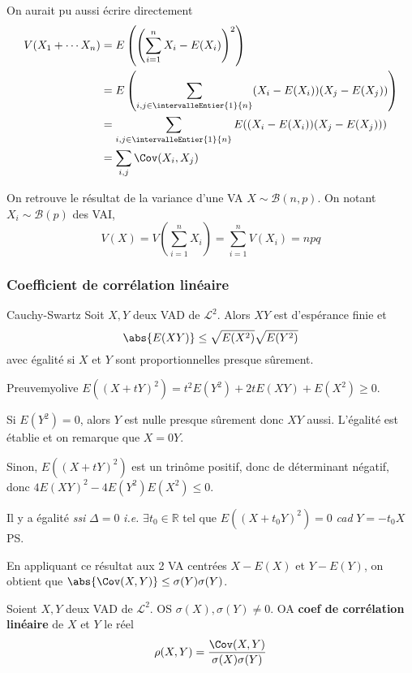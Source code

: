     On aurait pu aussi écrire directement
    \begin{align*}
        V(X_1 + \cdots X_n) 
        &= E\left(\left(\sum_{i = 1}^n X_i - E(X_i)\right)^2\right) \\
        &= E\left(\sum_{i,j \in \intervalleEntier{1}{n}} (X_i - E(X_i))(X_j - E(X_j))\right) \\
        &= \sum_{i,j \in \intervalleEntier{1}{n}} E((X_i - E(X_i))(X_j - E(X_j))) \\
        &= \sum_{i,j} \Cov(X_i, X_j)
    \end{align*} 

    On retrouve le résultat de la variance d’une VA $X \sim \mathcal{B}(n,p)$. On notant $X_i \sim \mathcal{B}(p)$ des VAI, 
    \[ V(X) = V(\sum_{i = 1}^n X_i) = \sum_{i =1}^n V(X_i) = npq \]   

    \subsubsection{Coefficient de corrélation linéaire}

    \begin{prop}{Cauchy-Swartz}{}
        Soit $X,Y$ deux VAD de $\mathcal{L}^2$. Alors $XY$ est d’espérance finie et 
        \[ \abs{E(XY)} \leq \sqrt{E(X^2)} \sqrt{E(Y^2)} \]   
        avec égalité si $X$ et $Y$ sont proportionnelles presque sûrement.
    \end{prop}

    \begin{demo}{Preuve}{myolive}
        $E((X + tY)^2) = t^2 E(Y^2) + 2t E(XY) + E(X^2) \geq 0$. 
        
        Si $E(Y^2) = 0$, alors $Y$ est nulle presque sûrement donc $XY$ aussi. L’égalité est établie et on remarque que $X = 0 Y$. 
        
        Sinon, $E((X + t Y)^2)$ est un trinôme positif, donc de déterminant négatif, donc $4 E(XY)^2 - 4 E(Y^2) E(X^2) \leq 0$. 
        
        Il y a égalité \textit{ssi} $\Delta = 0$ \textit{i.e.} $\exists t_0 \in \mathbb{R}$ tel que $E((X + t_0 Y)^2) = 0$ \textit{cad} $Y = -t_0 X$ PS.
    \end{demo}

    En appliquant ce résultat aux 2 VA centrées $X - E(X)$ et $Y - E(Y)$, on obtient que $\abs{\Cov(X,Y)} \leq \sigma(Y) \sigma(Y)$. 

    \begin{defi}{}{}
        Soient $X,Y$ deux VAD de $\mathcal{L}^2$. OS $\sigma(X), \sigma(Y) \neq 0$. OA \textbf{coef de corrélation linéaire} de $X$ et $Y$ le réel 
        \[ \rho(X,Y) = \frac{\Cov(X,Y)}{\sigma(X)\sigma(Y)} \]    
    \end{defi}

